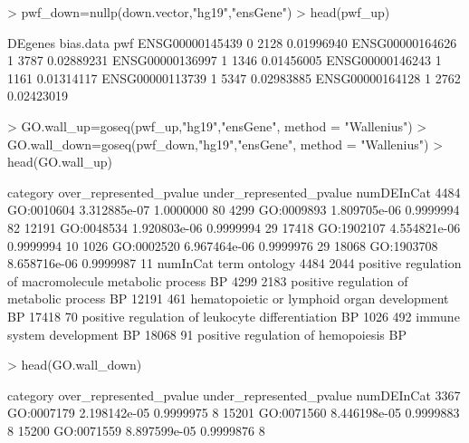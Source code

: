 \documentclass[a4paper,11pt]{article}
\begin{document}
\begin{Schunk}
\begin{Sinput}
> pwf_down=nullp(down.vector,"hg19","ensGene")
> head(pwf_up)
\end{Sinput}
\begin{Soutput}
                DEgenes bias.data        pwf
ENSG00000145439       0      2128 0.01996940
ENSG00000164626       1      3787 0.02889231
ENSG00000136997       1      1346 0.01456005
ENSG00000146243       1      1161 0.01314117
ENSG00000113739       1      5347 0.02983885
ENSG00000164128       1      2762 0.02423019
\end{Soutput}
\begin{Sinput}
> GO.wall_up=goseq(pwf_up,"hg19","ensGene", method = "Wallenius")
> GO.wall_down=goseq(pwf_down,"hg19","ensGene", method = "Wallenius")
> head(GO.wall_up)
\end{Sinput}
\begin{Soutput}
        category over_represented_pvalue under_represented_pvalue numDEInCat
4484  GO:0010604            3.312885e-07                1.0000000         80
4299  GO:0009893            1.809705e-06                0.9999994         82
12191 GO:0048534            1.920803e-06                0.9999994         29
17418 GO:1902107            4.554821e-06                0.9999994         10
1026  GO:0002520            6.967464e-06                0.9999976         29
18068 GO:1903708            8.658716e-06                0.9999987         11
      numInCat                                                   term ontology
4484      2044 positive regulation of macromolecule metabolic process       BP
4299      2183               positive regulation of metabolic process       BP
12191      461            hematopoietic or lymphoid organ development       BP
17418       70       positive regulation of leukocyte differentiation       BP
1026       492                              immune system development       BP
18068       91                     positive regulation of hemopoiesis       BP
\end{Soutput}
\begin{Sinput}
> head(GO.wall_down)
\end{Sinput}
\begin{Soutput}
        category over_represented_pvalue under_represented_pvalue numDEInCat
3367  GO:0007179            2.198142e-05                0.9999975          8
15201 GO:0071560            8.446198e-05                0.9999883          8
15200 GO:0071559            8.897599e-05                0.9999876          8

\end{Soutput}
\end{Schunk}
\end{document}
